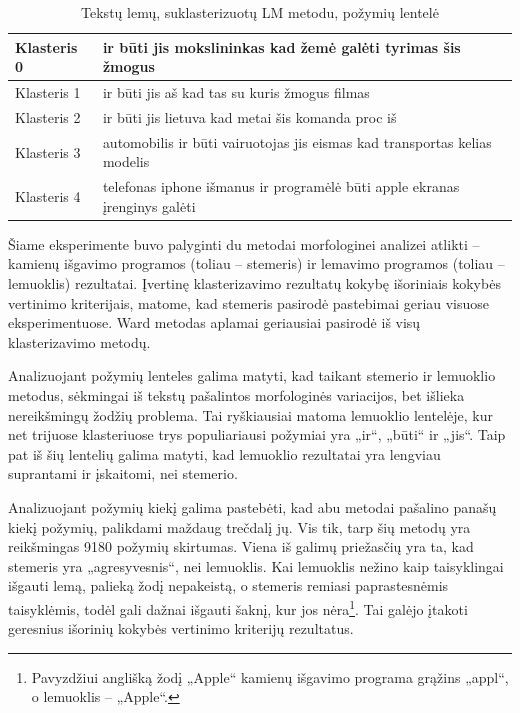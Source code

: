 \documentclass{VUMIFInfBakalaurinis}
\begin{document}
\begin{table}[H]
  \centering
\caption{Tekstų lemų, suklasterizuotų LM metodu, požymių lentelė}
\small
\begin{tabular}{|l|l|}
\hline
Klasteris 0 & ir būti jis mokslininkas kad žemė galėti tyrimas šis žmogus                \\ \hline
Klasteris 1 & ir būti jis aš kad tas su kuris žmogus filmas                              \\ \hline
Klasteris 2 & ir būti jis lietuva kad metai šis komanda proc iš                          \\ \hline
Klasteris 3 & automobilis ir būti vairuotojas jis eismas kad transportas kelias modelis  \\ \hline
Klasteris 4 & telefonas iphone išmanus ir programėlė būti apple ekranas įrenginys galėti \\ \hline
\end{tabular}
\normalsize
\end{table}

Šiame eksperimente buvo palyginti du metodai morfologinei analizei
atlikti -- kamienų išgavimo programos (toliau -- stemeris) ir lemavimo
programos (toliau -- lemuoklis) rezultatai. Įvertinę klasterizavimo
rezultatų kokybę išoriniais kokybės vertinimo kriterijais, matome, kad stemeris pasirodė
pastebimai geriau visuose eksperimentuose. Ward metodas aplamai
geriausiai pasirodė iš visų klasterizavimo metodų.

Analizuojant požymių lenteles galima matyti, kad taikant stemerio ir
lemuoklio metodus, sėkmingai iš tekstų pašalintos morfologinės
variacijos, bet išlieka nereikšmingų žodžių problema. Tai ryškiausiai
matoma lemuoklio lentelėje, kur net trijuose klasteriuose trys
populiariausi požymiai yra „ir“, „būti“ ir „jis“. Taip pat iš šių
lentelių galima matyti, kad lemuoklio rezultatai yra lengviau suprantami
ir įskaitomi, nei stemerio.

Analizuojant požymių kiekį galima pastebėti, kad abu metodai pašalino
panašų kiekį požymių, palikdami maždaug trečdalį jų. Vis tik, tarp šių
metodų yra reikšmingas 9180 požymių skirtumas. Viena iš galimų
priežasčių yra ta, kad stemeris yra „agresyvesnis“, nei lemuoklis. Kai
lemuoklis nežino kaip taisyklingai išgauti lemą, palieką žodį
nepakeistą, o stemeris remiasi paprastesnėmis taisyklėmis, todėl gali
dažnai išgauti šaknį, kur jos nėra\footnote{Pavyzdžiui anglišką žodį
  „Apple“ kamienų išgavimo programa grąžins „appl“, o lemuoklis --
  „Apple“.}. Tai galėjo įtakoti geresnius išorinių kokybės vertinimo kriterijų
rezultatus.
\end{document}
